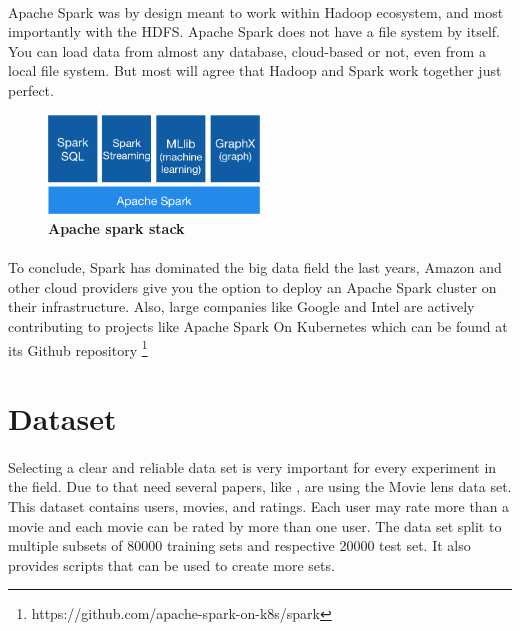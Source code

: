 \paragraph{}Apache Spark was by design meant to work within Hadoop ecosystem, and most importantly with the HDFS. Apache Spark does not have a file system by itself. You can load data from almost any database, cloud-based or not, even from a local file system. But most will agree that Hadoop and Spark work together just perfect. \\

\begin{figure}[ht]
  \centering
    \includegraphics[width=0.5\textwidth]{images/spark-stack.png}
    \caption{\bfseries Apache spark stack \cite{ApacheSpark:1}}
   \label{apacheSparkStack}
\end{figure}

\paragraph{} To conclude, Spark has dominated the big data field the last years, Amazon and other cloud providers give you the option to deploy an Apache Spark cluster on their infrastructure. Also, large companies like Google and Intel are actively contributing to projects like Apache Spark On Kubernetes which can be found at its Github repository \footnote{https://github.com/apache-spark-on-k8s/spark}

\section{Dataset}
\paragraph{}Selecting a clear and reliable data set is very important for every experiment in the field. Due to that need several papers, like \cite{levandoski2011recbench}, are using the Movie lens data set. This dataset contains users, movies, and ratings. Each user may rate more than a movie and each movie can be rated by more than one user. The data set split to multiple subsets of 80000 training sets and respective 20000 test set. It also provides scripts that can be used to create more sets.


